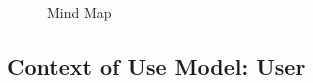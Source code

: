 \documentclass[a4paper,12pt]{report}
\begin{document}
\begin{figure}[!htb]
	\centering
	\caption{Mind Map}
	\label{fig: mind_map}
\end{figure}


\subsection{Context of Use Model: User}
\end{document}
